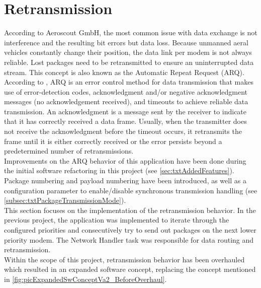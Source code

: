 \section{Retransmission}
%
According to Aeroscout GmbH, the most common issue with data exchange is not interference and the resulting bit errors but data loss. Because unmanned aeral vehicles constantly change their position, the data link per modem is not always reliable. Lost packages need to be retransmitted to ensure an uninterrupted data stream. This concept is also known as the Automatic Repeat Request (ARQ). According to \cite{ErrorDetectionAndCorrection_Wikipedia}, ARQ is an error control method for data transmission that makes use of error-detection codes, acknowledgment and/or negative acknowledgment messages (no acknowledgement received), and timeouts to achieve reliable data transmission. An acknowledgment is a message sent by the receiver to indicate that it has correctly received a data frame. Usually, when the transmitter does not receive the acknowledgment before the timeout occurs, it retransmits the frame until it is either correctly received or the error persists beyond a predetermined number of retransmissions.\\
Improvements on the ARQ behavior of this application have been done during the initial software refactoring in this project (see \autoref{sec:txtAddedFeatures}). Package numbering and payload numbering have been introduced, as well as a configuration parameter to enable/disable synchronous transmission handling (see \autoref{subsec:txtPackageTransmissionMode}).\\
This section focuses on the implementation of the retransmission behavior. In the previous project, the application was implemented to iterate through the configured priorities and consecutively try to send out packages on the next lower priority modem. The Network Handler task was responsible for data routing and retransmission.\\
Within the scope of this project, retransmission behavior has been overhauled which resulted in an expanded software concept, replacing the concept mentioned in \autoref{fig:picExpandedSwConceptVa2_BeforeOverhaul}.\\
